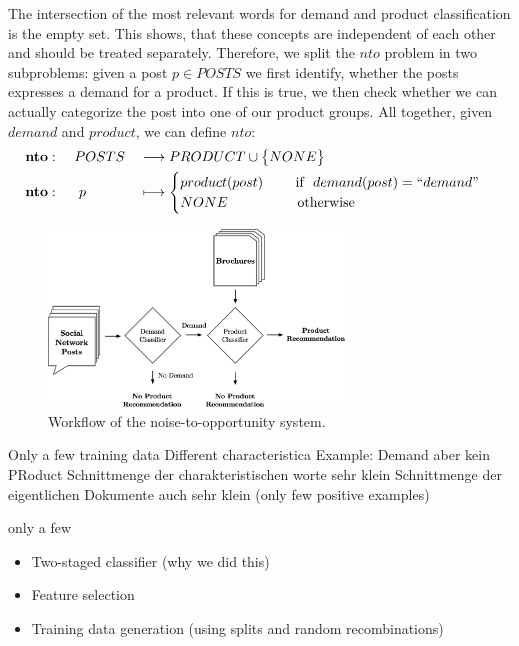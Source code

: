 The intersection of the most relevant words for demand and product classification is the empty set.
This shows, that these concepts are independent of each other and should be treated separately.
Therefore, we split the $nto$ problem in two subproblems: given a post $p \in POSTS$ we first identify, whether the posts expresses a demand for a product.
If this is true, we then check whether we can actually categorize the post into one of our product groups.
All together, given $demand$ and $product$, we can define $nto$:
\begin{alignat*}{3}
  &\mathbf{nto}: && ~POSTS && \longrightarrow PRODUCT \cup \big\{ NONE \big\} \\
  &\mathbf{nto}: && ~~p   && \longmapsto \begin{cases}
	    product(post)~~~~~~~\text{if }~demand(post) = ``demand" \\
	    NONE~~~~~~~~~~~~~~~\text{otherwise}
   \end{cases}
\end{alignat*}

\begin{figure}
	\caption{Workflow of the noise-to-opportunity system.}
	\begin{center}
		\includegraphics[width=0.7\textwidth]{figures/nto_workflow.eps}
	\end{center}
\end{figure}

Only a few training data
Different characteristica
Example: Demand aber kein PRoduct
Schnittmenge der charakteristischen worte sehr klein
Schnittmenge der eigentlichen Dokumente auch sehr klein (only few positive examples)

only a few 

\begin{itemize}
	\item Two-staged classifier (why we did this)
	\item Feature selection
	\item Training data generation (using splits and random recombinations)
\end{itemize}

